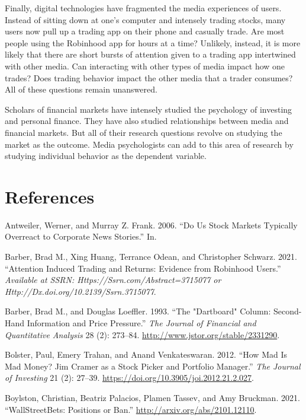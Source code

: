 \documentclass[12pt,]{article}
\begin{document}
Finally, digital technologies have fragmented the media experiences of
users. Instead of sitting down at one's computer and intensely trading
stocks, many users now pull up a trading app on their phone and casually
trade. Are most people using the Robinhood app for hours at a time?
Unlikely, instead, it is more likely that there are short bursts of
attention given to a trading app intertwined with other media. Can
interacting with other types of media impact how one trades? Does
trading behavior impact the other media that a trader consumes? All of
these questions remain unanswered.

Scholars of financial markets have intensely studied the psychology of
investing and personal finance. They have also studied relationships
between media and financial markets. But all of their research questions
revolve on studying the market as the outcome. Media psychologists can
add to this area of research by studying individual behavior as the
dependent variable.

\hypertarget{references}{%
\section*{References}\label{references}}

\hypertarget{refs}{}
\leavevmode\hypertarget{ref-antweiler2006}{}%
Antweiler, Werner, and Murray Z. Frank. 2006. ``Do Us Stock Markets
Typically Overreact to Corporate News Stories.'' In.

\leavevmode\hypertarget{ref-barber2021}{}%
Barber, Brad M., Xing Huang, Terrance Odean, and Christopher Schwarz.
2021. ``Attention Induced Trading and Returns: Evidence from Robinhood
Users.'' \emph{Available at SSRN: Https://Ssrn.com/Abstract=3715077 or
Http://Dx.doi.org/10.2139/Ssrn.3715077}.

\leavevmode\hypertarget{ref-barber1993}{}%
Barber, Brad M., and Douglas Loeffler. 1993. ``The "Dartboard" Column:
Second-Hand Information and Price Pressure.'' \emph{The Journal of
Financial and Quantitative Analysis} 28 (2): 273--84.
\url{http://www.jstor.org/stable/2331290}.

\leavevmode\hypertarget{ref-bolster2012}{}%
Bolster, Paul, Emery Trahan, and Anand Venkateswaran. 2012. ``How Mad Is
Mad Money? Jim Cramer as a Stock Picker and Portfolio Manager.''
\emph{The Journal of Investing} 21 (2): 27--39.
\url{https://doi.org/10.3905/joi.2012.21.2.027}.

\leavevmode\hypertarget{ref-boylston2021}{}%
Boylston, Christian, Beatriz Palacios, Plamen Tassev, and Amy Bruckman.
2021. ``WallStreetBets: Positions or Ban.''
\url{http://arxiv.org/abs/2101.12110}.
\end{document}
